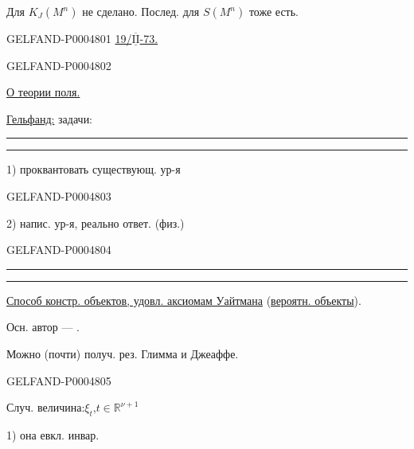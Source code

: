 Для $K_J(M^n)$ не сделано. Послед. для $S(M^n)$ тоже есть.


\begin{GelfandAdjacentEvidence}{GELFAND-P000480}{1}
\uline{19/\mbox{$\overline{\underline{\mathrm{II}}}$}-73.}
\qquad{}
\end{GelfandAdjacentEvidence}
\begin{GelfandAdjacentEvidence}{GELFAND-P000480}{2}


\uline{О теории поля.}

\uline{Гельфанд:} задачи:
{\centering\rule{1.1em}{.4pt}\quad\textperiodcentered\quad\rule{1.1em}{.4pt}\par}
1) проквантовать существующ. ур-я
\end{GelfandAdjacentEvidence}
\begin{GelfandAdjacentEvidence}{GELFAND-P000480}{3}


2) напис. ур-я, реально ответ. (физ.)
\end{GelfandAdjacentEvidence}
\begin{GelfandAdjacentEvidence}{GELFAND-P000480}{4}

{\centering\rule{1.8em}{.4pt}\quad\textperiodcentered\quad\rule{1.8em}{.4pt}\par}

\uline{Способ констр. объектов, удовл. аксиомам Уайтмана} (\uline{вероятн. объекты}).

Осн. автор — .

Можно (почти) получ. рез. Глимма и Джеаффе.
\end{GelfandAdjacentEvidence}
\begin{GelfandAdjacentEvidence}{GELFAND-P000480}{5}


Случ. величина:\quad $\xi_t$,\quad $t\in\mathbb R^{\nu+1}$
\end{GelfandAdjacentEvidence}


1) она евкл. инвар.

